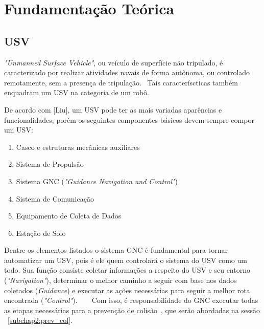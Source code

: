\chapter{Fundamentação Teórica}\label{chap2:fund_teo}
    \section{USV}\label{subchap2:USV}
        \textit{"Unmanned Surface Vehicle"}, ou veículo de superfície não tripulado, é caracterizado por realizar atividades navais de forma autônoma, ou controlado remotamente, sem a presença de tripulação.~\cite{LIU201671} Tais caracteríscticas também enquadram um USV na categoria de um robô.~\cite{JUR2020}
        
        De acordo com [Liu], um USV pode ter as mais variadas aparências e funcionalidades, porém os seguintes componentes básicos devem sempre compor um USV:~\cite{LIU201671}
        
        \begin{enumerate}
            \item Casco e estruturas mecânicas auxiliares
            \item Sistema de Propulsão
            \item Sistema GNC (\textit{"Guidance Navigation and Control"})
            \item Sistema de Comunicação
            \item Equipamento de Coleta de Dados
            \item Estação de Solo
        \end{enumerate}
        
        Dentre os elementos listados o sistema GNC é fundamental para tornar automatizar um USV, pois é ele quem controlará o sistema do USV como um todo. Sua função consiste coletar informações a respeito do USV e seu entorno (\textit{"Navigation"}), determinar o melhor caminho a seguir com base nos dados coletados (\textit{Guidance}) e executar as ações necessárias para seguir a melhor rota encontrada (\textit{"Control"}).  ~\cite{LIU201671} ~\cite{JUR2020} Com isso, é responsabilidade do GNC executar todas as etapas necessárias para a prevenção de colisão~\cite{HUANG2020451}, que serão abordadas na sessão ~\ref{subchap2:prev_col}. 
        
